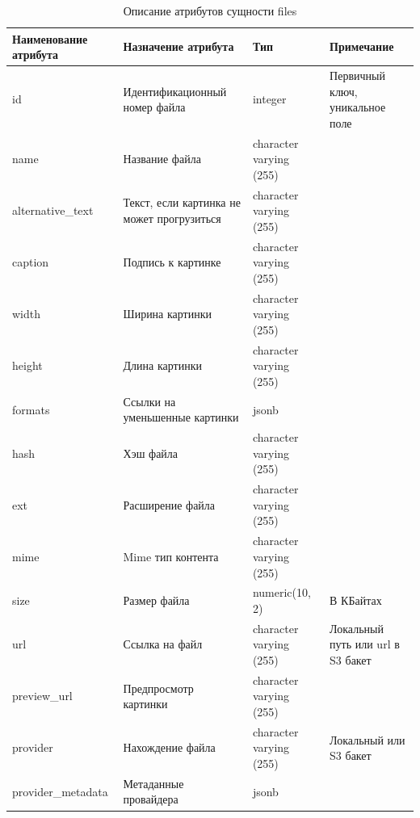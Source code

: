 \documentclass{mirea}
\begin{document}
	\begin{longtable}{ |p{}|p{}|p{}|p{}| } 
		\caption{Описание атрибутов сущности files}
		\endfirsthead
		\endhead
		\hline
		Наименование атрибута & Назначение атрибута & Тип & Примечание \\ \hline
		
		id & Идентификацион\-ный номер файла & integer & Первичный ключ, уникальное поле \\ \hline
		
		name & Название файла & character varying (255) &  \\ \hline
		
		alternative\_text & Текст, если картинка не может прогрузиться & character varying (255) &  \\ \hline
		
		caption & Подпись к картинке & character varying (255) &  \\ \hline
		
		width & Ширина картинки & character varying (255) &  \\ \hline
		
		height & Длина картинки & character varying (255) &  \\ \hline
		
		formats & Ссылки на уменьшенные картинки & jsonb &  \\ \hline
		
		hash & Хэш файла & character varying (255) &  \\ \hline
		
		ext & Расширение файла & character varying (255) &  \\ \hline
		
		mime & Mime тип контента & character varying (255) &  \\ \hline
		
		size & Размер файла & numeric(10, 2) & В КБайтах \\ \hline
		
		url & Ссылка на файл & character varying (255) & Локальный путь или url в S3 бакет \\ \hline
		
		preview\_url & Предпросмотр картинки & character varying (255) & \\ \hline
		
		provider & Нахождение файла & character varying (255) & Локальный или S3 бакет \\ \hline
		
		provider\_metadata & Метаданные провайдера & jsonb & \\ \hline
		

\end{longtable}
\end{document}
